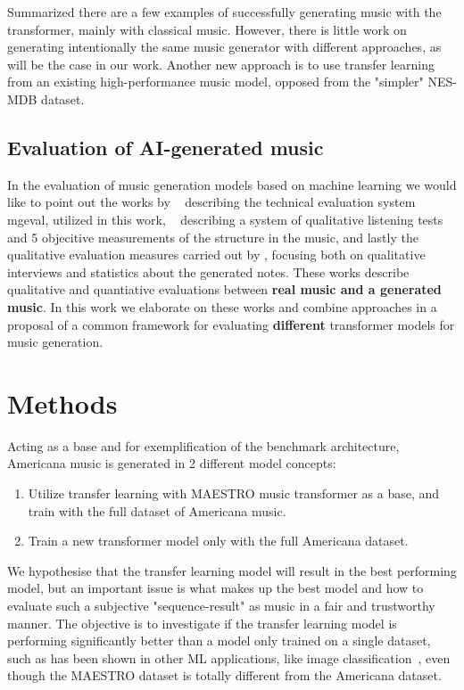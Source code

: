 \documentclass{IEEEtran}
\begin{document}
Summarized there are a few examples of successfully generating music with the transformer, mainly with classical music. However, there is little work on 
generating intentionally the same music generator with different approaches, 
as will be the case in our work. Another new approach is to use transfer
learning from an existing high-performance music model, opposed from the 
"simpler" NES-MDB dataset.

\subsection{Evaluation of AI-generated music}

In the evaluation of music generation models based on machine learning we would like to point out the
works by \citeauthor{yang2020evaluation}~\cite{yang2020evaluation} describing the technical 
evaluation system mgeval, utilized in this work,
\citeauthor{wu2020jazz}~\cite{wu2020jazz} describing a system of qualitative listening 
tests and 5 objecitive measurements of the structure in the music, and lastly the qualitative 
evaluation measures carried out by \citeauthor{sturm2017taking}
\cite{sturm2017taking}, focusing both on qualitative interviews and statistics about the 
generated notes. These works describe qualitative and quantiative evaluations between \textbf{real music and a generated music}. In this work we elaborate  on these works and combine approaches in a proposal of a common framework for evaluating \textbf{different} transformer models for music generation.

\section{Methods}

Acting as a base and for exemplification of the benchmark architecture,
Americana music is generated in 2 different model concepts:
\begin{enumerate}
    \item Utilize transfer learning with MAESTRO music transformer as a base,
        and train with the full dataset of Americana music.
    \item Train a new transformer model only with the full
        Americana dataset.
\end{enumerate}

We hypothesise that the transfer learning model will result in the best
performing
model, but an important issue is what makes up the best model and how to
evaluate such a subjective "sequence-result" as music in a fair and
trustworthy manner. The objective is to investigate if the transfer learning 
model is performing significantly better than a model only trained on
a single dataset, such as has been shown in other ML applications, like image
classification~\cite{7404017}, even though the MAESTRO dataset is totally
different from the Americana dataset.
\end{document}
